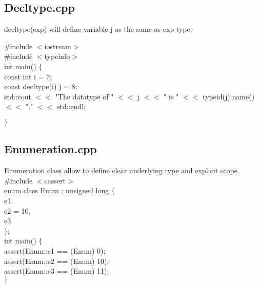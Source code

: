 \documentclass[11pt]{report}
\begin{document}
\subsection{Decltype.cpp}
\label{Decltype}
{\scriptsize decltype(exp) will define variable j as the same as exp type.

\#include $<$iostream$>$\\
\#include $<$typeinfo$>$\\

int main() $\lbrace$\\
  const int i = 7;\\
  const decltype(i) j = 8;\\

  std::cout $<<$ "The datatype of  " $<<$ j $<<$ " is " $<<$ typeid(j).name() $<<$ "." $<<$ std::endl;

$\rbrace$
}
\subsection{Enumeration.cpp}
\label{Enumeration}
{\scriptsize 
Enumeration class allow to define clear underlying type and explicit scope.\\

\#include $<$cassert$>$\\

enum class Enum : unsigned long $\lbrace$\\
  e1,\\
  e2 = 10,\\
  e3\\
$\rbrace$;\\

int main() $\lbrace$\\

 assert(Enum::e1 == (Enum) 0);\\
 assert(Enum::e2 == (Enum) 10);\\
 assert(Enum::e3 == (Enum) 11);\\
$\rbrace$
}
\end{document}
